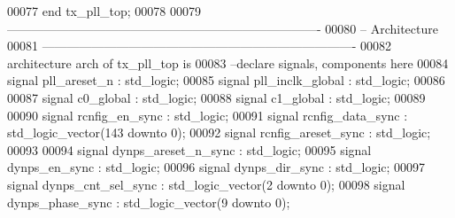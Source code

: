 \begin{DoxyCode}
00077 \textcolor{keywordflow}{end} \textcolor{vhdlchar}{tx\_pll\_top};
00078 
00079 \textcolor{keyword}{----------------------------------------------------------------------------}
00080 \textcolor{keyword}{-- Architecture}
00081 \textcolor{keyword}{----------------------------------------------------------------------------}
00082 \textcolor{keywordflow}{architecture} arch \textcolor{keywordflow}{of} tx_pll_top is
00083 \textcolor{keyword}{--declare signals,  components here}
00084 \textcolor{keywordflow}{signal} \textcolor{vhdlchar}{pll_areset_n}              \textcolor{vhdlchar}{:} \textcolor{comment}{std\_logic};
00085 \textcolor{keywordflow}{signal} \textcolor{vhdlchar}{pll_inclk_global}          \textcolor{vhdlchar}{:} \textcolor{comment}{std\_logic};
00086 
00087 \textcolor{keywordflow}{signal} \textcolor{vhdlchar}{c0_global}                 \textcolor{vhdlchar}{:} \textcolor{comment}{std\_logic};
00088 \textcolor{keywordflow}{signal} \textcolor{vhdlchar}{c1_global}                 \textcolor{vhdlchar}{:} \textcolor{comment}{std\_logic};
00089       
00090 \textcolor{keywordflow}{signal} \textcolor{vhdlchar}{rcnfig_en_sync}            \textcolor{vhdlchar}{:} \textcolor{comment}{std\_logic};
00091 \textcolor{keywordflow}{signal} \textcolor{vhdlchar}{rcnfig_data_sync}          \textcolor{vhdlchar}{:} \textcolor{comment}{std\_logic\_vector}\textcolor{vhdlchar}{(}\textcolor{vhdllogic}{}\textcolor{vhdllogic}{143} \textcolor{keywordflow}{downto} \textcolor{vhdllogic}{}\textcolor{vhdllogic}{0}\textcolor{vhdlchar}{)};
00092 \textcolor{keywordflow}{signal} \textcolor{vhdlchar}{rcnfig_areset_sync}        \textcolor{vhdlchar}{:} \textcolor{comment}{std\_logic};
00093 
00094 \textcolor{keywordflow}{signal} \textcolor{vhdlchar}{dynps_areset_n_sync}       \textcolor{vhdlchar}{:} \textcolor{comment}{std\_logic};
00095 \textcolor{keywordflow}{signal} \textcolor{vhdlchar}{dynps_en_sync}             \textcolor{vhdlchar}{:} \textcolor{comment}{std\_logic};
00096 \textcolor{keywordflow}{signal} \textcolor{vhdlchar}{dynps_dir_sync}            \textcolor{vhdlchar}{:} \textcolor{comment}{std\_logic};
00097 \textcolor{keywordflow}{signal} \textcolor{vhdlchar}{dynps_cnt_sel_sync}        \textcolor{vhdlchar}{:} \textcolor{comment}{std\_logic\_vector}\textcolor{vhdlchar}{(}\textcolor{vhdllogic}{}\textcolor{vhdllogic}{2} \textcolor{keywordflow}{downto} \textcolor{vhdllogic}{}\textcolor{vhdllogic}{0}\textcolor{vhdlchar}{)};
00098 \textcolor{keywordflow}{signal} \textcolor{vhdlchar}{dynps_phase_sync}          \textcolor{vhdlchar}{:} \textcolor{comment}{std\_logic\_vector}\textcolor{vhdlchar}{(}\textcolor{vhdllogic}{}\textcolor{vhdllogic}{9} \textcolor{keywordflow}{downto} \textcolor{vhdllogic}{}\textcolor{vhdllogic}{0}\textcolor{vhdlchar}{)};

\end{DoxyCode}
